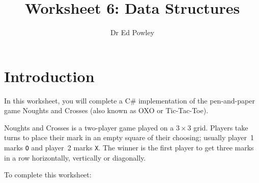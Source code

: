 \documentclass{../../../fal_assignment}
\title{Worksheet 6: Data Structures}
\author{Dr Ed Powley}
\begin{document}
\maketitle
{}

\section*{Introduction}

In this worksheet, you will complete a C\# implementation of the pen-and-paper game Noughts and Crosses
(also known as OXO or Tic-Tac-Toe).

Noughts and Crosses is a two-player game played on a $3 \times 3$ grid.
Players take turns to place their mark in an empty square of their choosing; usually
player~1 marks \texttt{O} and player~2 marks \texttt{X}.
The winner is the first player to get three marks in a row horizontally, vertically or diagonally.

To complete this worksheet:
\end{document}
